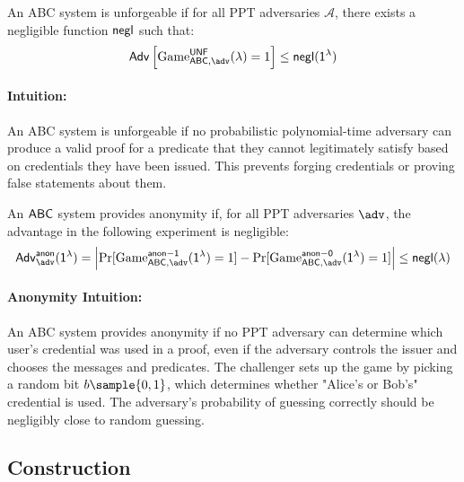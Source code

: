 \begin{definition}[Unforgeability]
An ABC system is unforgeable if for all PPT adversaries $\mathcal{A}$, there exists a negligible function $\mathsf{negl}$ such that:
\[
\mathsf{Adv}\left[\mathrm{Game}^{\mathsf{\UNF}}_{\ABC, \adv}(\lambda) = 1\right] \leq \negl(\secparam)
\]
\end{definition}

\paragraph{Intuition:} An ABC system is unforgeable if no probabilistic polynomial-time adversary can produce a valid proof for a predicate that they cannot legitimately satisfy based on credentials they have been issued. This prevents forging credentials or proving false statements about them.

\begin{definition}[Anonymity]
An $\mathsf{ABC}$ system provides anonymity if, for all PPT adversaries $\adv$, the advantage in the following experiment is negligible:
\[
\mathsf{Adv}^{\mathsf{anon}}_{\adv}(\secparam) = \left| \Pr[\mathrm{Game}^{\mathsf{anon-1}}_{\ABC, \adv}(\secparam) = 1] - \Pr[\mathrm{Game}^{\mathsf{anon-0}}_{\ABC, \adv}(\secparam) = 1] \right| \leq \negl(\lambda)
\]
\end{definition}


\paragraph{Anonymity Intuition:} An ABC system provides anonymity if no PPT adversary can determine which user's credential was used in a proof, even if the adversary controls the issuer and chooses the messages and predicates. The challenger sets up the game by picking a random bit $b \sample \{0,1\}$, which determines whether "Alice's or Bob's" credential is used. The adversary's probability of guessing correctly should be negligibly close to random guessing.




\subsection{Construction}



